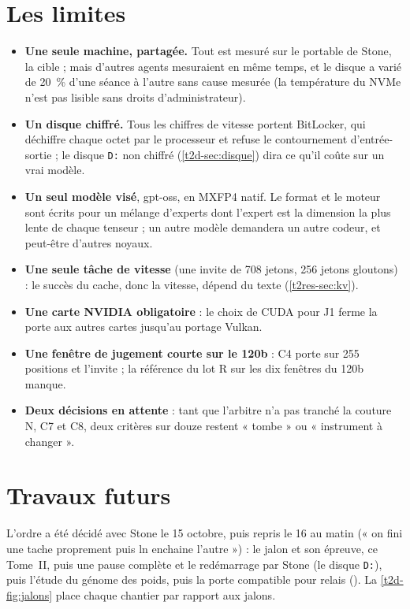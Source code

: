 \section{Les limites}\label{t2d-sec:limites}

\begin{itemize}
\item \textbf{Une seule machine, partagée.} Tout est mesuré sur le portable de Stone, la cible ; mais d'autres agents mesuraient en même temps, et le disque a varié de \SI{20}{\percent} d'une séance à l'autre sans cause mesurée (la température du NVMe n'est pas lisible sans droits d'administrateur).
\item \textbf{Un disque chiffré.} Tous les chiffres de vitesse portent BitLocker, qui déchiffre chaque octet par le processeur et refuse le contournement d'entrée-sortie ; le disque \texttt{D:} non chiffré (\cref{t2d-sec:disque}) dira ce qu'il coûte sur un vrai modèle.
\item \textbf{Un seul modèle visé}, gpt-oss, en MXFP4 natif. Le format et le moteur sont écrits pour un mélange d'experts dont l'expert est la dimension la plus lente de chaque tenseur ; un autre modèle demandera un autre codeur, et peut-être d'autres noyaux.
\item \textbf{Une seule tâche de vitesse} (une invite de 708 jetons, 256 jetons gloutons) : le succès du cache, donc la vitesse, dépend du texte (\cref{t2res-sec:kv}).
\item \textbf{Une carte NVIDIA obligatoire} : le choix de CUDA pour J1 ferme la porte aux autres cartes jusqu'au portage Vulkan.
\item \textbf{Une fenêtre de jugement courte sur le 120b} : C4 porte sur 255 positions et l'invite ; la référence du lot R sur les dix fenêtres du 120b manque.
\item \textbf{Deux décisions en attente} : tant que l'arbitre n'a pas tranché la couture N, C7 et C8, deux critères sur douze restent « tombe » ou « instrument à changer ».
\end{itemize}

\section{Travaux futurs}\label{t2d-sec:futurs}

L'ordre a été décidé avec Stone le 15 octobre, puis repris le 16 au matin (« on fini une tache proprement puis ln enchaine l'autre ») : le jalon et son épreuve, ce Tome~II, puis une pause complète et le redémarrage par Stone (le disque \texttt{D:}), puis l'étude du génome des poids, puis la porte compatible pour relais (). La \cref{t2d-fig:jalons} place chaque chantier par rapport aux jalons.

